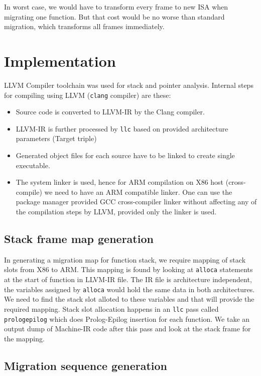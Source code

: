 \documentclass[a4paper]{article}
\begin{document}
In worst case, we would have to transform every frame to new ISA when migrating one function. But that cost would be no worse than standard migration, which transforms all frames immediately.

\section{Implementation}

LLVM Compiler toolchain was used for stack and pointer analysis.
Internal steps for compiling using LLVM (\texttt{clang} compiler) are these:
\begin{itemize}
    \item Source code is converted to LLVM-IR by the Clang compiler.
    \item LLVM-IR is further processed by \texttt{llc} based on provided architecture parameters (Target triple)
    \item Generated object files for each source have to be linked to create single executable.
    \item The system linker is used, hence for ARM compilation on X86 host (cross-compile) we need to have an ARM compatible linker. One can use the package manager provided GCC cross-compiler linker without affecting any of the compilation steps by LLVM, provided only the linker is used.
\end{itemize}

\subsection{Stack frame map generation}

In generating a migration map for function stack, we require mapping of stack slots from X86 to ARM.
This mapping is found by looking at \texttt{alloca} statements at the start of function in LLVM-IR file.
The IR file is architecture independent, the variables assigned by \texttt{alloca} would hold the same data in both architectures.
We need to find the stack slot alloted to these variables and that will provide the required mapping.
Stack slot allocation happens in an \texttt{llc} pass called \texttt{prologepilog} which does Prolog-Epilog insertion
for each function. We take an output dump of Machine-IR code after this pass and look at the stack frame for the mapping.

\subsection{Migration sequence generation}
\end{document}
